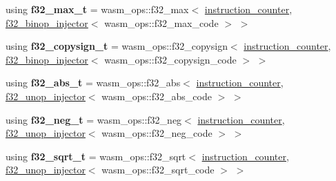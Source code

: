 \begin{DoxyCompactItemize}
using {\bfseries f32\+\_\+max\+\_\+t} = wasm\+\_\+ops\+::f32\+\_\+max$<$ \mbox{\hyperlink{structaacio_1_1chain_1_1wasm__injections_1_1instruction__counter}{instruction\+\_\+counter}}, \mbox{\hyperlink{structaacio_1_1chain_1_1wasm__injections_1_1f32__binop__injector}{f32\+\_\+binop\+\_\+injector}}$<$ wasm\+\_\+ops\+::f32\+\_\+max\+\_\+code $>$ $>$
\item 
\mbox{\label{structaacio_1_1chain_1_1wasm__injections_1_1pre__op__injectors_a31cb0d59434f3f24fac6f329262df0c2}} 
using {\bfseries f32\+\_\+copysign\+\_\+t} = wasm\+\_\+ops\+::f32\+\_\+copysign$<$ \mbox{\hyperlink{structaacio_1_1chain_1_1wasm__injections_1_1instruction__counter}{instruction\+\_\+counter}}, \mbox{\hyperlink{structaacio_1_1chain_1_1wasm__injections_1_1f32__binop__injector}{f32\+\_\+binop\+\_\+injector}}$<$ wasm\+\_\+ops\+::f32\+\_\+copysign\+\_\+code $>$ $>$
\item 
\mbox{\label{structaacio_1_1chain_1_1wasm__injections_1_1pre__op__injectors_a6ffaead05d8cd4600746c2996e02f143}} 
using {\bfseries f32\+\_\+abs\+\_\+t} = wasm\+\_\+ops\+::f32\+\_\+abs$<$ \mbox{\hyperlink{structaacio_1_1chain_1_1wasm__injections_1_1instruction__counter}{instruction\+\_\+counter}}, \mbox{\hyperlink{structaacio_1_1chain_1_1wasm__injections_1_1f32__unop__injector}{f32\+\_\+unop\+\_\+injector}}$<$ wasm\+\_\+ops\+::f32\+\_\+abs\+\_\+code $>$ $>$
\item 
\mbox{\label{structaacio_1_1chain_1_1wasm__injections_1_1pre__op__injectors_ab57e9b061868db028ef406034365a00e}} 
using {\bfseries f32\+\_\+neg\+\_\+t} = wasm\+\_\+ops\+::f32\+\_\+neg$<$ \mbox{\hyperlink{structaacio_1_1chain_1_1wasm__injections_1_1instruction__counter}{instruction\+\_\+counter}}, \mbox{\hyperlink{structaacio_1_1chain_1_1wasm__injections_1_1f32__unop__injector}{f32\+\_\+unop\+\_\+injector}}$<$ wasm\+\_\+ops\+::f32\+\_\+neg\+\_\+code $>$ $>$
\item 
\mbox{\label{structaacio_1_1chain_1_1wasm__injections_1_1pre__op__injectors_a4d436981cadb4f193be50006f7cd2dd8}} 
using {\bfseries f32\+\_\+sqrt\+\_\+t} = wasm\+\_\+ops\+::f32\+\_\+sqrt$<$ \mbox{\hyperlink{structaacio_1_1chain_1_1wasm__injections_1_1instruction__counter}{instruction\+\_\+counter}}, \mbox{\hyperlink{structaacio_1_1chain_1_1wasm__injections_1_1f32__unop__injector}{f32\+\_\+unop\+\_\+injector}}$<$ wasm\+\_\+ops\+::f32\+\_\+sqrt\+\_\+code $>$ $>$

\end{DoxyCompactItemize}
